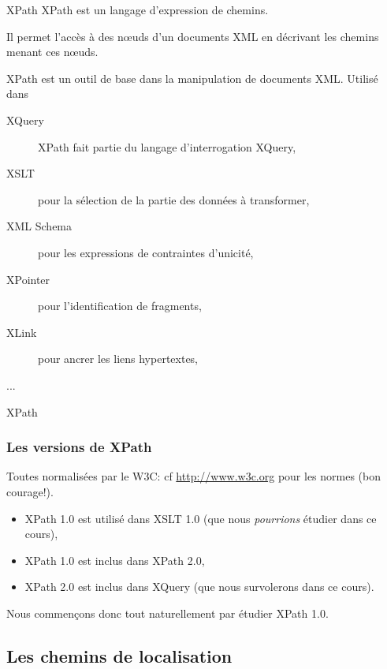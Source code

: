 
\begin{frame}{XPath}
XPath est un langage \alert{d'expression de chemins}.

\vfill

Il permet l'accès à des 
 n{\oe}uds d’un documents XML en décrivant les chemins menant ces n{\oe}uds.

\vfill

XPath est un outil de base dans la manipulation de documents XML. Utilisé dans 
\begin{description}
\item[XQuery] XPath fait partie du langage d’interrogation XQuery,
\item[XSLT] pour la sélection de la partie des données à transformer,
\item[XML Schema] pour les expressions de contraintes d’unicité,
\item[XPointer] pour l'identification de fragments,
\item[XLink] pour ancrer les liens hypertextes,
\item[...]
\end{description}
\end{frame}


\begin{frame}{XPath}
\frametitle{Les versions de XPath}

Toutes normalisées par le W3C: cf \url{http://www.w3c.org} pour les normes (bon courage!).

\begin{itemize}
\item XPath 1.0 est utilisé dans XSLT 1.0 (que nous \textit{pourrions} étudier dans ce cours),
\item XPath 1.0 est inclus dans XPath 2.0,
\item XPath 2.0 est inclus dans XQuery (que nous survolerons dans ce cours).
\end{itemize}

Nous commen\c{c}ons donc tout naturellement par étudier XPath 1.0.
\end{frame}


\subsection{Les chemins de localisation}

